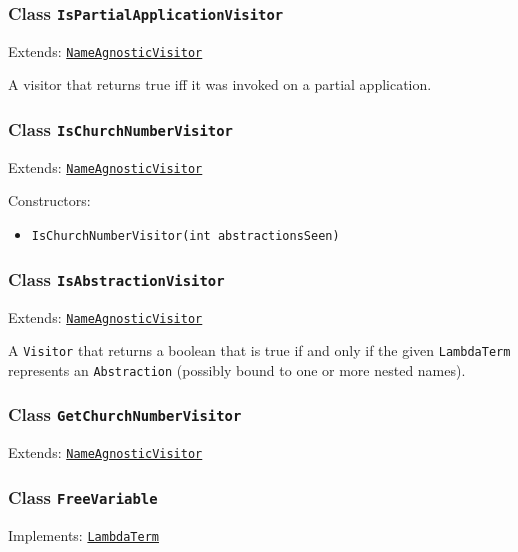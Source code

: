 \subsubsection{Class \texttt{IsPartialApplicationVisitor}}
\label{type:edu.kit.wavelength.client.model.term.IsPartialApplicationVisitor}
Extends: \texttt{\hyperref[type:edu.kit.wavelength.client.model.term.NameAgnosticVisitor]{NameAgnosticVisitor}}

A visitor that returns true iff it was invoked on a partial application.

\subsubsection{Class \texttt{IsChurchNumberVisitor}}
\label{type:edu.kit.wavelength.client.model.term.IsChurchNumberVisitor}
Extends: \texttt{\hyperref[type:edu.kit.wavelength.client.model.term.NameAgnosticVisitor]{NameAgnosticVisitor}}



Constructors:
\begin{itemize}
\item \texttt{IsChurchNumberVisitor(int abstractionsSeen)}



\end{itemize}

\subsubsection{Class \texttt{IsAbstractionVisitor}}
\label{type:edu.kit.wavelength.client.model.term.IsAbstractionVisitor}
Extends: \texttt{\hyperref[type:edu.kit.wavelength.client.model.term.NameAgnosticVisitor]{NameAgnosticVisitor}}

A \texttt{Visitor} that returns a boolean that is true if and only if the
 given \texttt{LambdaTerm} represents an \texttt{Abstraction} (possibly bound to
 one or more nested names).

\subsubsection{Class \texttt{GetChurchNumberVisitor}}
\label{type:edu.kit.wavelength.client.model.term.GetChurchNumberVisitor}
Extends: \texttt{\hyperref[type:edu.kit.wavelength.client.model.term.NameAgnosticVisitor]{NameAgnosticVisitor}}



\subsubsection{Class \texttt{FreeVariable}}
\label{type:edu.kit.wavelength.client.model.term.FreeVariable}
Implements: \texttt{\hyperref[type:edu.kit.wavelength.client.model.term.LambdaTerm]{LambdaTerm}}

